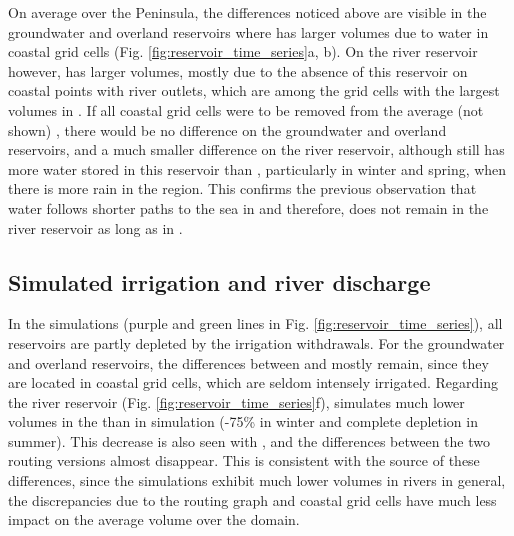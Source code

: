 On average over the Peninsula, the differences noticed above are visible in the groundwater and overland reservoirs where \native has larger volumes due to water in coastal grid cells (Fig. \ref{fig:reservoir_time_series}a, b). On the river reservoir however, \std has larger volumes, mostly due to the absence of this reservoir on coastal points with river outlets, which are among the grid cells with the largest volumes in \std.
If all coastal grid cells were to be removed from the average (not shown)%
, there would be no difference on the groundwater and overland reservoirs, and a much smaller difference on the river reservoir, although \std still has more water stored in this reservoir than \native, particularly in winter and spring, when there is more rain in the region. This confirms the previous observation that water follows shorter paths to the sea in \native and therefore, does not remain in the river reservoir as long as in \std.
\subsection{Simulated irrigation and river discharge}

In the \irr simulations (purple and green lines in Fig. \ref{fig:reservoir_time_series}), all reservoirs are partly depleted by the irrigation withdrawals. For the groundwater and overland reservoirs, the differences between \std and \native mostly remain, since they are located in coastal grid cells, which are seldom intensely irrigated.
Regarding the river reservoir (Fig. \ref{fig:reservoir_time_series}f), \std simulates much lower volumes in the \irr than in \noirr simulation (-75\% in winter and complete depletion in summer). This decrease is also seen with \native, and the differences between the two routing versions almost disappear. This is consistent with the source of these differences, since the \irr simulations exhibit much lower volumes in rivers in general, the discrepancies due to the routing graph and coastal grid cells have much less impact on the average volume over the domain.

